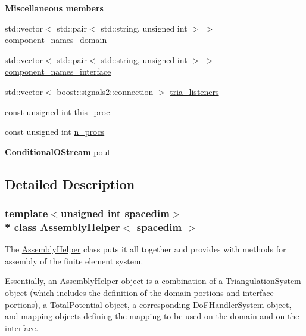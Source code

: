 \begin{Indent}{\bf Miscellaneous members}\par
\begin{DoxyCompactItemize}
\item 
std\+::vector$<$ std\+::pair$<$ std\+::string, unsigned int $>$ $>$ \hyperlink{class_assembly_helper_af5e29448f133863a1859be8bfbb300c6}{component\+\_\+names\+\_\+domain}
\item 
std\+::vector$<$ std\+::pair$<$ std\+::string, unsigned int $>$ $>$ \hyperlink{class_assembly_helper_a7ae6ae2ec356cbb7b830d968315d280c}{component\+\_\+names\+\_\+interface}
\item 
std\+::vector$<$ boost\+::signals2\+::connection $>$ \hyperlink{class_assembly_helper_a228cec028ab5126d25c3ebf0e12a17a6}{tria\+\_\+listeners}
\item 
const unsigned int \hyperlink{class_assembly_helper_a2aad83ae1bfe5338794cf9b50848469a}{this\+\_\+proc}
\item 
const unsigned int \hyperlink{class_assembly_helper_a87945d87baf37637673fd124b3803fd5}{n\+\_\+procs}
\item 
{\bf Conditional\+O\+Stream} \hyperlink{class_assembly_helper_a717eb6ebc7c62fe00063edcf264f3ecc}{pout}
\end{DoxyCompactItemize}
\end{Indent}


\subsection{Detailed Description}
\subsubsection*{template$<$unsigned int spacedim$>$\\*
class Assembly\+Helper$<$ spacedim $>$}

The \hyperlink{class_assembly_helper}{Assembly\+Helper} class puts it all together and provides with methods for assembly of the finite element system.

Essentially, an \hyperlink{class_assembly_helper}{Assembly\+Helper} object is a combination of a \hyperlink{class_triangulation_system}{Triangulation\+System} object (which includes the definition of the domain portions and interface portions), a \hyperlink{class_total_potential}{Total\+Potential} object, a corresponding \hyperlink{class_do_f_handler_system}{Do\+F\+Handler\+System} object, and mapping objects defining the mapping to be used on the domain and on the interface.

